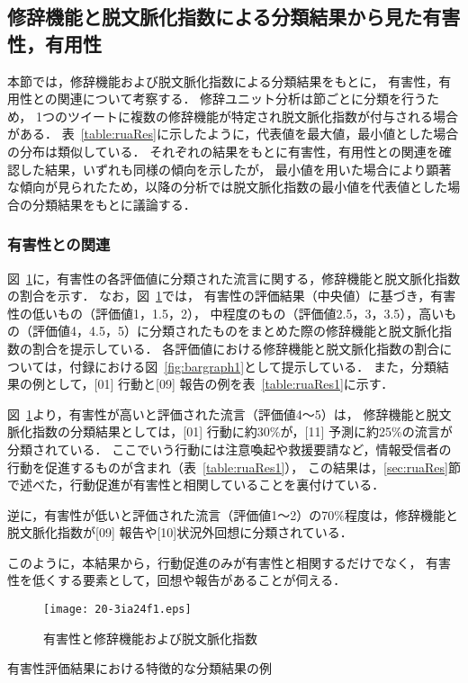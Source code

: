 \documentclass[japanese]{jnlp_1.4}
\begin{document}
\subsection{修辞機能と脱文脈化指数による分類結果から見た有害性，有用性}
\label{sec:ResTotal}

本節では，修辞機能および脱文脈化指数による分類結果をもとに，
有害性，有用性との関連について考察する．
修辞ユニット分析は節ごとに分類を行うため，
1つのツイートに複数の修辞機能が特定され脱文脈化指数が付与される場合がある．
表~\ref{table:ruaRes}に示したように，代表値を最大値，最小値とした場合の分布は類似している．
それぞれの結果をもとに有害性，有用性との関連を確認した結果，いずれも同様の傾向を示したが，
最小値を用いた場合により顕著な傾向が見られたため，以降の分析では脱文脈化指数の最小値を代表値とした場合の分類結果をもとに議論する．


\subsubsection*{有害性との関連}

図~\ref{fig:bargraph_yugai}に，有害性の各評価値に分類された流言に関する，修辞機能と脱文脈化指数の割合を示す．
なお，図~\ref{fig:bargraph_yugai}では，
有害性の評価結果（中央値）に基づき，有害性の低いもの（評価値1，1.5，2），
中程度のもの（評価値2.5，3，3.5），高いもの（評価値4，4.5，5）に分類されたものをまとめた際の修辞機能と脱文脈化指数の割合を提示している．
各評価値における修辞機能と脱文脈化指数の割合については，付録における図~\ref{fig:bargraph1}として提示している．
また，分類結果の例として，[01] 行動と[09] 報告の例を表~\ref{table:ruaRes1}に示す．

図~\ref{fig:bargraph_yugai}より，有害性が高いと評価された流言（評価値4〜5）は，
修辞機能と脱文脈化指数の分類結果としては，[01] 行動に約30\%が，[11] 予測に約25\%の流言が分類されている．
ここでいう行動には注意喚起や救援要請など，情報受信者の行動を促進するものが含まれ（表~\ref{table:ruaRes1}），
この結果は，\ref{sec:ruaRes}節で述べた，行動促進が有害性と相関していることを裏付けている．

逆に，有害性が低いと評価された流言（評価値1〜2）の70\%程度は，修辞機能と脱文脈化指数が[09] 報告や[10]状況外回想に分類されている．

このように，本結果から，行動促進のみが有害性と相関するだけでなく，
有害性を低くする要素として，回想や報告があることが伺える．

\begin{figure}[p]
\begin{center}
\texttt{[image: 20-3ia24f1.eps]}
\end{center}
\caption{有害性と修辞機能および脱文脈化指数}
\label{fig:bargraph_yugai}
\end{figure}
\begin{table}[p]
\caption{有害性評価結果における特徴的な分類結果の例}
\label{table:ruaRes1}

\end{table}
\end{document}
